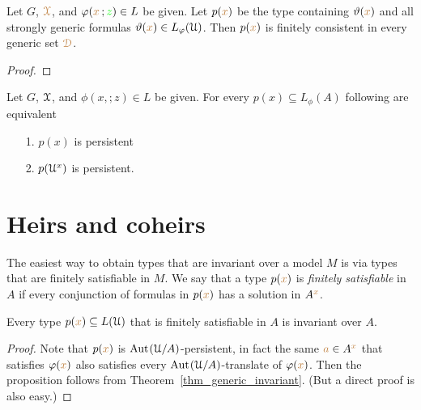 \begin{theorem}\label{thm_generic_invariant}
  Let $G$, ${\color{brown}\EuScript X}$, and $\varphi({\color{brown} x}\,;{\color{green} z})\in L$ be given.
  Let $p({\color{brown} x})$ be the type containing $\vartheta({\color{brown} x})$ and all strongly generic formulas $\vartheta({\color{brown} x})\in L_\varphi(\EuScript U)$.
  Then $p({\color{brown} x})$ is finitely consistent in every generic set ${\color{brown}\EuScript D}$.

  \begin{proof}
    
  \end{proof}
\end{theorem}

\begin{exercise}\label{ex_persistent_types}
  Let $G$,  $\EuScript X$, and $\phi(x,;z)\in L$ be given.
  For every $p(x)\subseteq L_\phi(A)$ following are equivalent
  \begin{itemize}
    \item[1.] $p(x)$ is persistent
    \item[2.] $p(\EuScript U^x)$ is persistent.
  \end{itemize}
\end{exercise}

\section{Heirs and coheirs}
\label{coheirs}

The easiest way to obtain types that are invariant over a model $M$ is via types that are finitely satisfiable in $M$.
We say that a type $p({\color{brown} x})$ is \emph{finitely satisfiable\/} in $A$ if every conjunction of formulas in $p({\color{brown} x})$ has a solution in $A^{\color{brown} x}$.

\begin{proposition}\label{prop_coeredi_quasiinvarienti}
Every type $p({\color{brown} x})\subseteq L(\EuScript U)$ that is finitely satisfiable in $A$ is invariant over $A$.
\end{proposition}

\begin{proof}
  Note that $p({\color{brown} x})$ is ${\rm Aut\kern.15ex}(\EuScript U/A)$-persistent, in fact the same ${\color{brown} a}\in A^{\color{brown} x}$ that satisfies $\varphi({\color{brown} x})$ also satisfies every ${\rm Aut\kern.15ex}(\EuScript U/A)$-translate of $\varphi({\color{brown} x})$.
  Then the proposition follows from Theorem~\ref{thm_generic_invariant}.
  (But a direct proof is also easy.)  
\end{proof}

